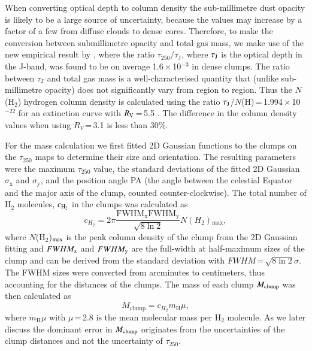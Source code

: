 \documentclass[printer]{aa}
\begin{document}
When converting optical depth to column density the sub-millimetre dust opacity is likely to be a large source of uncertainty, because the values may increase by a factor of a few from diffuse clouds to dense cores. Therefore, to make the conversion between submillimetre opacity and total gas mass, we make use of the new empirical result by \citet{juvela2015b}, where the ratio $\tau_{250}$/$\tau\mathrm{_J}$, where $\tau_{\rm J}$ is the optical depth in the J-band, was found to be on average 1.6\,$\times$\,10$^{-3}$ in dense clumps. The ratio between $\tau\mathrm{_J}$ and total gas mass is a well-characterised quantity that (unlike sub-millimetre opacity) does not significantly vary from region to region. 
Thus the $N$(H$_2$) hydrogen column density is calculated using the ratio $\tau_{\rm J}$/$N$(H)\,=\,1.994\,$\times$\,10$^{-22}$ for an extinction curve with $R_{\rm V}$\,=\,5.5 \citep{draine2003}. The difference in the column density values when using $R_V$\,=\,3.1 is less than 30\%.

For the mass calculation we first fitted 2D Gaussian functions to the clumps on the $\tau_{250}$ maps to determine their size and orientation. The resulting parameters were the maximum $\tau_{250}$ value, the standard deviations of the fitted 2D Gaussian $\sigma\mathrm{_x}$ and $\sigma\mathrm{_y}$, and the position angle PA (the angle between the celestial Equator and the major axis of the clump, counted counter-clockwise). The total number of H$_2$ molecules, $c_{\rm H_2}$ in the clumps was calculated as
\begin{equation}
c_{H_2}=2\pi\frac{\mathrm{FWHM_x}\mathrm{FWHM_y}}{\sqrt{8\ln2}}N(H_2)\mathrm{_{max}},
\end{equation}
where $N$(H$_2$)$_{\rm max}$ is the peak column density of the clump from the 2D Gaussian fitting and $FWHM_{\rm x}$ and $FWHM_{\rm y}$ are the full-width at half-maximum sizes of the clump and can be derived from the standard deviation with $FWHM$\,=\,$\sqrt{8\ln2}\sigma$. The FWHM sizes were converted from arcminutes to centimeters, thus accounting for the distances of the clumps. 
The mass of each clump $M_{\rm clump}$ was then calculated as
\begin{equation}
M\mathrm{_{clump}}=c_{H_2}m\mathrm{_H}\mu,
\end{equation}
where $m\mathrm{_H}\mu$ with $\mu$\,=\,2.8 is the mean molecular mass per H$_2$ molecule. As we later discuss the dominant error in $M_{\rm clump}$ originates from the uncertainties of the clump distances and not the uncertainty of $\tau_{250}$.
\end{document}
